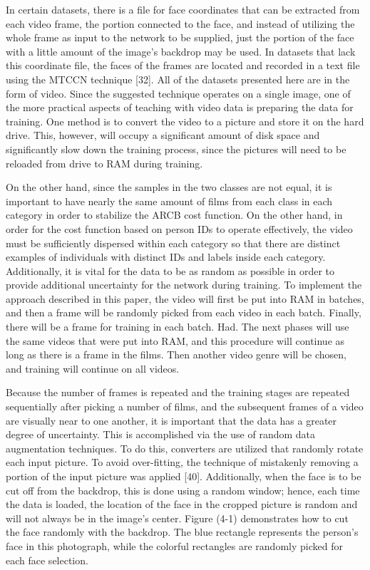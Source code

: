 \documentclass[journal]{IEEEtran}
\begin{document}
In certain datasets, there is a file for face coordinates that can be extracted from each video frame, the portion connected to the face, and instead of utilizing the whole frame as input to the network to be supplied, just the portion of the face with a little amount of the image's backdrop may be used. In datasets that lack this coordinate file, the faces of the frames are located and recorded in a text file using the MTCCN technique [32].
All of the datasets presented here are in the form of video. Since the suggested technique operates on a single image, one of the more practical aspects of teaching with video data is preparing the data for training. One method is to convert the video to a picture and store it on the hard drive. This, however, will occupy a significant amount of disk space and significantly slow down the training process, since the pictures will need to be reloaded from drive to RAM during training.

On the other hand, since the samples in the two classes are not equal, it is important to have nearly the same amount of films from each class in each category in order to stabilize the ARCB cost function. On the other hand, in order for the cost function based on person IDs to operate effectively, the video must be sufficiently dispersed within each category so that there are distinct examples of individuals with distinct IDs and labels inside each category. Additionally, it is vital for the data to be as random as possible in order to provide additional uncertainty for the network during training.
To implement the approach described in this paper, the video will first be put into RAM in batches, and then a frame will be randomly picked from each video in each batch. Finally, there will be a frame for training in each batch. Had. The next phases will use the same videos that were put into RAM, and this procedure will continue as long as there is a frame in the films. Then another video genre will be chosen, and training will continue on all videos.

Because the number of frames is repeated and the training stages are repeated sequentially after picking a number of films, and the subsequent frames of a video are visually near to one another, it is important that the data has a greater degree of uncertainty. This is accomplished via the use of random data augmentation techniques. To do this, converters are utilized that randomly rotate each input picture.
To avoid over-fitting, the technique of mistakenly removing a portion of the input picture was applied [40]. Additionally, when the face is to be cut off from the backdrop, this is done using a random window; hence, each time the data is loaded, the location of the face in the cropped picture is random and will not always be in the image's center.
Figure (4-1) demonstrates how to cut the face randomly with the backdrop. The blue rectangle represents the person's face in this photograph, while the colorful rectangles are randomly picked for each face selection.
\end{document}
